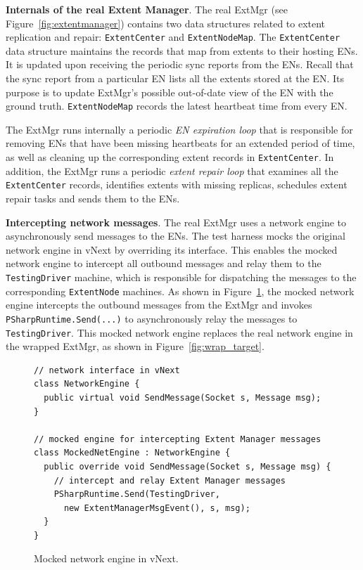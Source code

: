 \textbf{Internals of the real Extent Manager}.
The real ExtMgr (see Figure~\ref{fig:extentmanager}) contains two data structures related to extent replication and repair: \texttt{ExtentCenter} and \texttt{ExtentNodeMap}. The \texttt{ExtentCenter} data structure maintains the records that map from extents to their hosting ENs. It is updated upon receiving the periodic sync reports from the ENs. Recall that the sync report from a particular EN lists all the extents stored at the EN. Its purpose is to update ExtMgr's possible out-of-date view of the EN with the ground truth. \texttt{ExtentNodeMap} records the latest heartbeat time from every EN.

The ExtMgr runs internally a periodic \emph{EN expiration loop} that is responsible for removing ENs that have been missing heartbeats for an extended period of time, as well as cleaning up the corresponding extent records in \texttt{ExtentCenter}. In addition, the ExtMgr runs a periodic \emph{extent repair loop} that examines all the \texttt{ExtentCenter} records, identifies extents with missing replicas, schedules extent repair tasks and sends them to the ENs.

\textbf{Intercepting network messages}.
The real ExtMgr uses a network engine to asynchronously send messages to the ENs. The \psharp test harness mocks the original network engine in vNext by overriding its interface. This enables the mocked network engine to intercept all outbound messages and relay them to the \texttt{TestingDriver} machine, which is responsible for dispatching the messages to the corresponding \texttt{ExtentNode} machines. As shown in Figure~\ref{fig:enginecode}, the mocked network engine intercepts the outbound messages from the ExtMgr and invokes \texttt{PSharpRuntime.Send(...)} to asynchronously relay the messages to \texttt{TestingDriver}. This mocked network engine replaces the real network engine in the wrapped ExtMgr, as shown in Figure~\ref{fig:wrap_target}.

\begin{figure}[t]
\begin{lstlisting}
// network interface in vNext
class NetworkEngine {
  public virtual void SendMessage(Socket s, Message msg);
}

// mocked engine for intercepting Extent Manager messages
class MockedNetEngine : NetworkEngine {
  public override void SendMessage(Socket s, Message msg) {
    // intercept and relay Extent Manager messages
    PSharpRuntime.Send(TestingDriver,
      new ExtentManagerMsgEvent(), s, msg);
  }
}
\end{lstlisting}
\vspace{-4mm}
\caption{Mocked network engine in vNext.}
\label{fig:enginecode}
\vspace{-2mm}
\end{figure}

